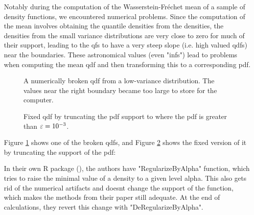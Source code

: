 Notably during the computation of the Wasserstein-Fréchet mean of a sample of density
functions, we encountered numerical problems. Since the computation of the mean involves
obtaining the quantile densities from the densities, the densities from the small
variance distributions are very close to zero for much of their support, leading to the
qfs to have a very steep slope (i.e. high valued qdfs) near the boundaries. These
astronomical values (even "infs") lead to problems when computing the mean qdf and then
transforming this to a corresponding pdf.

\begin{figure}[h]
    \centering
    \resizebox{0.9\textwidth}{!}{}
    \caption[Example of broken qdf]{A numerically broken qdf from a low-variance distribution.
    The values near the right boundary became too large to store for the computer.}
    \label{fig:broken_qdf}
\end{figure}

\begin{figure}[h]
    \centering
    \resizebox{0.9\textwidth}{!}{}
    \caption[Example of fixed qdf]{Fixed qdf by truncating the pdf support to where
    the pdf is greater than $\varepsilon = \nobreak 10^{-3}$.}
    \label{fig:fixed_qdf}
\end{figure}

Figure \ref{fig:broken_qdf} shows one of the broken qdfs, and Figure \ref{fig:fixed_qdf}
shows the fixed version of it by truncating the support of the pdf:

In their own R package (), the authors have "RegularizeByAlpha"
function, which tries to raise the minimal value of a density to a given level alpha. This
also gets rid of the numerical artifacts and doesnt change the support of the function,
which makes the methods from their paper still adequate. At the end of calculations, they
revert this change with "DeRegularizeByAlpha".
